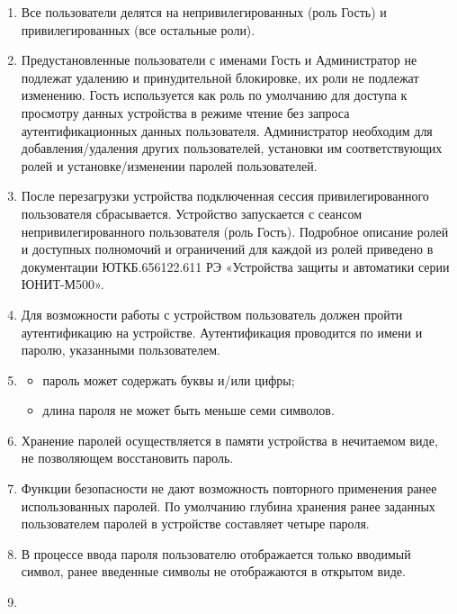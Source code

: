\documentclass[a4paper, 12pt, table, hidelinks, DIV=calc]{extarticle}
\def\ManualUnitGeneral{ЮТКБ.656122.611 РЭ «Устройства защиты и автоматики серии ЮНИТ-М500»}
\begin{document}
\begin{enumerate}[label=\arabic{section}.\arabic{subsection}.\arabic*, labelsep=7pt, leftmargin=0pt, itemindent=60pt, align=left]
\begin{enumerate}
\item 
Все пользователи делятся на непривилегированных (роль Гость) и привилегированных (все остальные роли).

\item
Предустановленные пользователи с именами Гость и Администратор не подлежат удалению и принудительной блокировке, их роли не подлежат изменению.
Гость используется как роль по умолчанию для доступа к просмотру данных устройства в режиме чтение без запроса аутентификационных данных пользователя.
Администратор необходим для добавления/удаления других пользователей, установки им соответствующих ролей и установке/изменении паролей пользователей.

\item
После перезагрузки устройства подключенная сессия привилегированного пользователя сбрасывается.
Устройство запускается с сеансом непривилегированного пользователя (роль Гость).
Подробное описание ролей и доступных полномочий и ограничений для каждой из ролей приведено в документации \ManualUnitGeneral.

\item
Для возможности работы с устройством пользователь должен пройти аутентификацию на устройстве.
Аутентификация проводится по имени и паролю, указанными пользователем. 

\item
{}
\begin{itemize}
    \item пароль может содержать буквы и/или цифры;
    \item длина пароля не может быть меньше семи символов. 
\end{itemize}

\item
Хранение паролей осуществляется в памяти устройства в нечитаемом виде, не позволяющем восстановить пароль.

\item
Функции безопасности не дают возможность повторного применения ранее использованных паролей.
По умолчанию глубина хранения ранее заданных пользователем паролей в устройстве составляет четыре пароля.

\item
В процессе ввода пароля пользователю отображается только вводимый символ, ранее введенные символы не отображаются в открытом виде.

\item
{}


\end{enumerate}
\end{enumerate}
\end{document}
